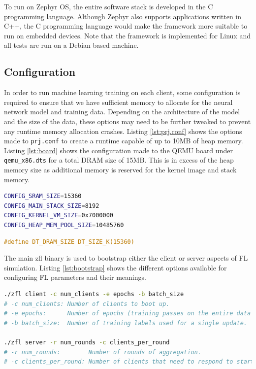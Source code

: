 \documentclass[12pt]{article}
\begin{document}
To run on Zephyr OS, the entire software stack is developed in the C programming language. Although
Zephyr also supports applications written in C++, the C programming language would make the framework
more suitable to run on embedded devices. Note that the framework is implemented for Linux and all tests are run
on a Debian based machine.

\subsection{Configuration}
In order to run machine learning training on each client, some configuration is required to ensure
that we have sufficient memory to allocate for the neural network model and training data. Depending
on the architecture of the model and the size of the data, these options may need to be further tweaked to
prevent any runtime memory allocation crashes. Listing \ref{lst:prj.conf} shows the options made to
\verb|prj.conf| to create a runtime capable of up to 10MB of heap memory. Listing
\ref{lst:board} shows
the configuration made to the QEMU board under \verb|qemu_x86.dts| for a total DRAM size of 15MB.
This is in excess of the heap memory size as additional memory is reserved for the kernel image and
stack memory.\\

\begin{minipage}[b][][b]{.45\textwidth}
\begin{lstlisting}[language=bash,caption={Zephyr prj.conf},label={lst:prj.conf}]
CONFIG_SRAM_SIZE=15360
CONFIG_MAIN_STACK_SIZE=8192
CONFIG_KERNEL_VM_SIZE=0x7000000
CONFIG_HEAP_MEM_POOL_SIZE=10485760
\end{lstlisting}
\end{minipage}\hfill
\begin{minipage}[b][][b]{.45\textwidth}
\begin{lstlisting}[language=C,caption={QEMU board.dts},label={lst:board}]
#define DT_DRAM_SIZE DT_SIZE_K(15360)
\end{lstlisting}
\end{minipage}

The main zfl binary is used to bootstrap either the client or server aspects of FL simulation.
Listing \ref{lst:bootstrap} shows the different options available for configuring FL parameters and
their meanings.
\begin{lstlisting}[language=bash,caption={The main zfl binary},label={lst:bootstrap}]
./zfl client -c num_clients -e epochs -b batch_size
# -c num_clients: Number of clients to boot up.
# -e epochs:      Number of epochs (training passes on the entire data set).
# -b batch_size:  Number of training labels used for a single update.

./zfl server -r num_rounds -c clients_per_round
# -r num_rounds:        Number of rounds of aggregation.
# -c clients_per_round: Number of clients that need to respond to start a round.
\end{lstlisting}
\end{document}

